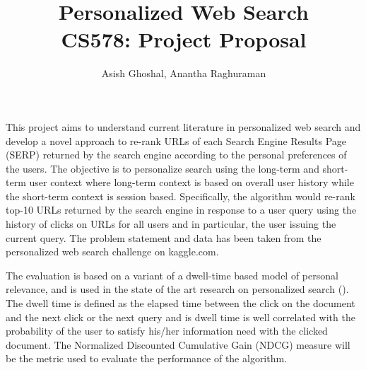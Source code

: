 \documentclass{article}      %
\title{Personalized Web Search \\ CS578: Project Proposal}
\author{Asish Ghoshal, Anantha Raghuraman}
\newcommand{\xcite}[1]{(\cite{#1})}
\begin{document}

\maketitle                   %

This project aims to understand current literature in personalized web search and develop a novel approach to 
re-rank URLs of each Search Engine Results Page (SERP) returned by the search engine according to the personal preferences of the users. 
The objective is to personalize search using the long-term and short-term user context where long-term context is based on overall user history
while the short-term context is session based. 
Specifically, the algorithm would re-rank top-10 URLs returned by the search engine in response
to a user query using the history of clicks on URLs for all users and in particular, the user issuing the current query. 
The problem statement and data has been taken from the personalized web search challenge on kaggle.com.  

The evaluation is based on a variant of a dwell-time based model of personal relevance,
and is used in the state of the art research on personalized search \xcite{Eickhoff2013, Shokouhi2013, Wang2013}. The dwell time 
is defined as the elapsed time between the click on the document and the next click or the next query and is dwell time is well correlated 
with the probability of the user to satisfy his/her information need with the clicked document.
The Normalized Discounted Cumulative Gain (NDCG) measure will be the metric used to evaluate the performance of the algorithm.





\end{document}
